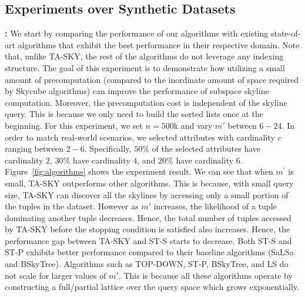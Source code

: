 \subsection{Experiments over Synthetic Datasets}
 \textbf{:} We start by comparing the performance of our algorithms with existing state-of-art algorithms that exhibit the best performance in their respective domain. Note that, unlike TA-SKY, the rest of the algorithms do not leverage any indexing structure. The goal of this experiment is to demonstrate how utilizing a small amount of precomputation (compared to the inordinate amount of space required by Skycube algorithms) can improve the performance of subspace skyline computation. Moreover, the precomputation cost is independent of the skyline query. This is because we only need to build the sorted lists once at the beginning. For this experiment, we set $n=500$k and vary $m'$ between $6-24$. In order to match real-world scenarios, we selected attributes with cardinality $c$ ranging between $2-6$. Specifically, $50\%$ of the selected attributes have cardinality $2$, $30\%$ have cardinality $4$, and $20\%$ have cardinality $6$. Figure~\ref{fig:algorithms} shows the experiment result. We can see that when $m^\prime$ is small, TA-SKY outperforms other algorithms. This is because, with small query size, TA-SKY can discover all the skylines by accessing only a small portion of the tuples in the dataset. However as $m'$ increases, the likelihood of a tuple dominating another tuple decreases. Hence, the total number of tuples accessed by TA-SKY before the stopping condition is satisfied also increases. Hence, the performance gap between TA-SKY and ST-S starts to decrease. Both ST-S and ST-P exhibits better performance compared to their baseline algorithms (SaLSa and BSkyTree). Algorithms such as TOP-DOWN, ST-P, BSkyTree, and LS do not scale for larger values of $m'$. This is because all these algorithms operate by constructing a full/partial lattice over the query space which grows exponentially.



